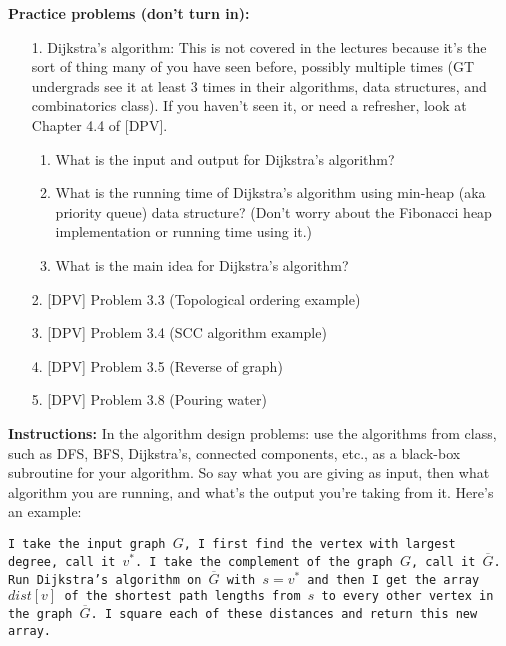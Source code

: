 \documentclass{article}
\newcommand{\heading}[6]{
  \renewcommand{\thepage}{\arabic{page}} %
  \noindent
  \begin{center}
  \framebox{
    \vbox{
      \hbox to 5.78in { \textbf{#2} \hfill #3 }
      \vspace{4mm}
      \hbox to 5.78in { {\Large \hfill #6  \hfill} }
      \vspace{2mm}
      \hbox to 5.78in { \textit{Instructor: #4 \hfill #5} }
    }
  }
  \end{center}
  \vspace*{4mm}
}
\newcommand{\problemset}[2]{\heading{#1}{\classname}{#2}{Problem Set #1}} %
\newcommand{\problemsetnum}{4}            %
\newcommand{\duedate}{2/19/2018} %
\newcommand{\studentname}{Student Name: }      %
\newcommand{\classname}{CS 8803 GA -- HW 4.  \ \ Due: \duedate \ \ \ Name:   }
\begin{document}

{\bf \noindent  Practice problems (don't turn in):}
\begin{enumerate}
\item[1.] Dijkstra's algorithm:  This is not covered in the lectures because it's the sort of thing 
many of you have seen before, possibly multiple times (GT undergrads see it at least 3 times in their algorithms, data structures, and combinatorics class).  If you haven't seen it, or need a refresher, look at Chapter 4.4 of [DPV].
\begin{enumerate}
\item What is the input and output for Dijkstra's algorithm?
\item What is the running time of Dijkstra's algorithm using min-heap (aka priority queue) data structure?  (Don't worry about the Fibonacci heap implementation or running time using it.)
\item What is the main idea for Dijkstra's algorithm?
\end{enumerate}

\item[2.] [DPV] Problem 3.3 (Topological ordering example)

\item[3.] [DPV] Problem 3.4 (SCC algorithm example)

\item[4.] [DPV] Problem 3.5 (Reverse of graph)

\item[5.] [DPV] Problem 3.8 (Pouring water)

\end{enumerate}


{\noindent \bf Instructions: }  
In the algorithm design problems: 
use the algorithms from class, such as DFS, BFS, Dijkstra's, connected components, etc., as a
black-box subroutine for your algorithm.  So say what you are giving as input, then what algorithm you are running, and what's the output you're taking from it.  
Here's an example:

{\tt I take the input graph $G$, I first find the vertex with largest degree, call it $v^*$.
I take the complement of the graph $G$, call it $\overline{G}$.
Run Dijkstra's algorithm on $\overline{G}$ with $s=v^*$ and then I get the
array $dist[v]$ of the 
shortest path lengths from $s$ to every other vertex in the graph $\overline{G}$. 
I square each of these distances and return this new array. }
\end{document}
